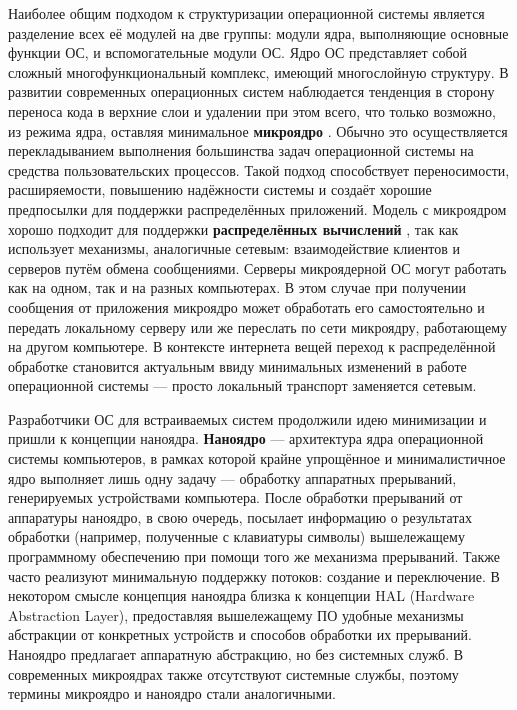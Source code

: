 Наиболее общим подходом к структуризации операционной системы является разделение всех её модулей на две группы: модули ядра, выполняющие основные функции ОС, и вспомогательные модули ОС. Ядро ОС \cite{Olifer} представляет собой сложный многофункциональный комплекс, имеющий многослойную структуру. В развитии современных операционных систем наблюдается тенденция в сторону переноса кода в верхние слои и удалении при этом всего, что только возможно, из режима ядра, оставляя минимальное \textbf{микроядро} \cite{Tanenbaum}. Обычно это осуществляется перекладыванием выполнения большинства задач операционной системы на средства пользовательских процессов. Такой подход способствует переносимости, расширяемости, повышению надёжности системы и создаёт хорошие предпосылки для поддержки распределённых приложений. Модель с микроядром хорошо подходит для поддержки \textbf{распределённых вычислений} \cite{Olifer}, так как использует механизмы, аналогичные сетевым: взаимодействие клиентов и серверов путём обмена сообщениями. Серверы микроядерной ОС могут работать как на одном, так и на разных компьютерах. В этом случае при получении сообщения от приложения микроядро может обработать его самостоятельно и передать локальному серверу или же переслать по сети микроядру, работающему на другом компьютере. В контексте интернета вещей переход к распределённой обработке становится актуальным ввиду минимальных изменений в работе операционной системы --- просто локальный транспорт заменяется сетевым.

Разработчики ОС для встраиваемых систем продолжили идею минимизации и пришли к концепции наноядра. \textbf{Наноядро} \cite{Nanokernel} --- архитектура ядра операционной системы компьютеров, в рамках которой крайне упрощённое и минималистичное ядро выполняет лишь одну задачу --- обработку аппаратных прерываний, генерируемых устройствами компьютера. После обработки прерываний от аппаратуры наноядро, в свою очередь, посылает информацию о результатах обработки (например, полученные с клавиатуры символы) вышележащему программному обеспечению при помощи того же механизма прерываний. Также часто реализуют минимальную поддержку потоков: создание и переключение. В некотором смысле концепция наноядра близка к концепции HAL (Hardware Abstraction Layer), предоставляя вышележащему ПО удобные механизмы абстракции от конкретных устройств и способов обработки их прерываний. Наноядро предлагает аппаратную абстракцию, но без системных служб. В современных микроядрах также отсутствуют системные службы, поэтому термины микроядро и наноядро стали аналогичными.



